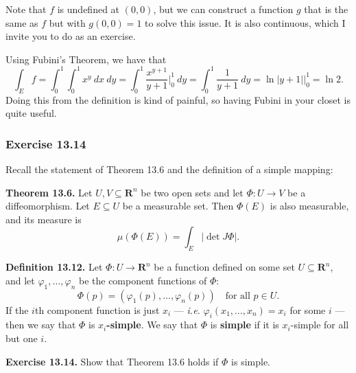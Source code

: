 \documentclass{article}
\newcommand{\R}{\mathbf{R}}
\theoremstyle{plain} %
\numberwithin{thm}{section} %
\theoremstyle{definition}
\begin{document}
    Note that \(f\) is undefined at \((0,0)\), but we can construct a function \(g\) that is the same as \(f\) but with \(g(0,0) = 1\) to solve this issue. It is also continuous, which I invite you to do as an exercise.

    Using Fubini's Theorem, we have that
    \[
        \int _E f = \int _0^1 \int _0^1 x^y\ dx\ dy = \int _0^1 \frac{x^{y+1}}{y + 1}\Big| _0^1\ dy = \int _0^1 \frac{1}{y + 1}\ dy = \ln |y + 1| \Big| _0^1 = \ln 2.
    \]
    Doing this from the definition is kind of painful, so having Fubini in your closet is quite useful.

    \subsubsection{Exercise 13.14}
    Recall the statement of Theorem 13.6 and the definition of a simple mapping:

    \textbf{Theorem 13.6.} Let $U,V\subseteq\R^n$ be two open sets and let $\Phi:U\rightarrow V$ be a diffeomorphism. Let $E\subseteq U$ be a measurable set. Then $\Phi(E)$ is also measurable, and its measure is
        \[ \mu(\Phi(E)) = \int_E |\det J\Phi|. \]

    \textbf{Definition 13.12.} Let $\Phi:U\rightarrow \R^n$ be a function defined on some set $U\subseteq \R^n$, and let $\varphi_1,\ldots,\varphi_n$ be the component functions of $\Phi$:
        \[ \Phi(p) = (\varphi_1(p), \ldots, \varphi_n(p)) \quad \text{for all $p\in U$.} \]
    If the $i$th component function is just $x_i$ --- \textit{i.e.} $\varphi_i(x_1,\ldots,x_n)=x_i$ for some $i$ --- then we say that $\Phi$ is \textbf{$x_i$-simple}. We say that $\Phi$ is \textbf{simple} if it is $x_i$-simple for all but one $i$.

    \textbf{Exercise 13.14.} Show that Theorem 13.6 holds if \(\Phi\) is simple.
\end{document}
